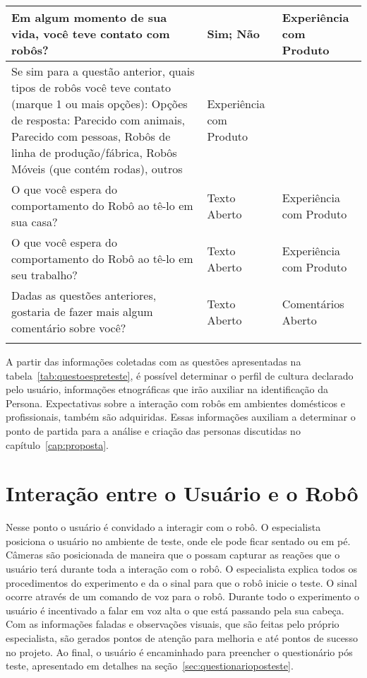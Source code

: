 \begin{longtable}{ m{7 cm} | m{4cm} | m{4cm} }
	Em algum momento de sua vida, você teve contato com robôs? & Sim; Não & Experiência com Produto \\ \hline
	Se sim para a questão anterior, quais tipos de robôs você teve contato (marque 1 ou mais opções): Opções de resposta: Parecido com animais, Parecido com pessoas, Robôs de linha de produção/fábrica, Robôs Móveis (que contém rodas), outros  & Experiência com Produto \\ \hline
	O que você espera do comportamento do Robô ao tê-lo em sua casa? & Texto Aberto & Experiência com Produto \\ \hline
	O que você espera do comportamento do Robô ao tê-lo em seu trabalho? & Texto Aberto & Experiência com Produto \\ \hline
	Dadas as questões anteriores, gostaria de fazer mais algum comentário sobre você? & Texto Aberto & Comentários Aberto \\ \hline
	\smallcaption{Fonte: O autor.}
\end{longtable}

A partir das informações coletadas com as questões apresentadas na tabela~\ref{tab:questoespreteste}, é possível determinar o perfil de cultura declarado pelo usuário, informações etnográficas que irão auxiliar na identificação da Persona. Expectativas sobre a interação com robôs em ambientes domésticos e profissionais, também são adquiridas. Essas informações auxiliam a determinar o ponto de partida para a análise e criação das personas discutidas no capítulo~\ref{cap:proposta}.

\section{Interação entre o Usuário e o Robô}
\label{sec:experimentointeracao}
Nesse ponto o usuário é convidado a interagir com o robô. O especialista posiciona o usuário no ambiente de teste, onde ele pode ficar sentado ou em pé. Câmeras são posicionada de maneira que o possam capturar as reações que o usuário terá durante toda a interação com o robô. O especialista explica todos os procedimentos do experimento e da o sinal para que o robô inicie o teste. O sinal ocorre através de um comando de voz para o robô. Durante todo o experimento o usuário é incentivado a falar em voz alta o que está passando pela sua cabeça. Com as informações faladas e observações visuais, que são feitas pelo próprio especialista, são gerados pontos de atenção para melhoria e até pontos de sucesso no projeto. Ao final, o usuário é encaminhado para preencher o questionário pós teste, apresentado em detalhes na seção~\ref{sec:questionarioposteste}.


